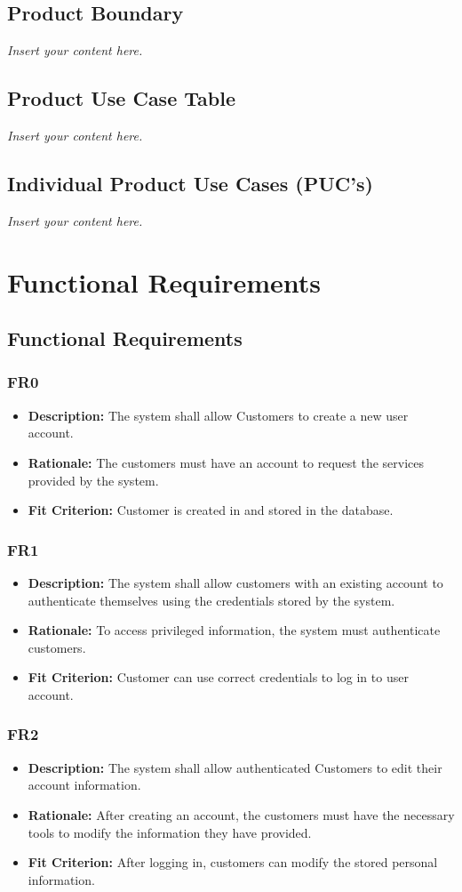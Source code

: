 \documentclass[12pt]{article}
\newcommand{\lips}{\textit{Insert your content here.}}
\begin{document}
\subsection{Product Boundary}
\lips
\subsection{Product Use Case Table}
\lips
\subsection{Individual Product Use Cases (PUC's)}
\lips

\section{Functional Requirements}
\subsection{Functional Requirements}
\subsubsection*{FR0}
\begin{itemize}
  \item \textbf{Description:} The system shall allow Customers to create a new user account.
  \item \textbf{Rationale:} The customers must have an account to request the services provided by the system.
  \item \textbf{Fit Criterion:} Customer is created in and stored in the database.
\end{itemize}
\subsubsection*{FR1}
\begin{itemize}
  \item \textbf{Description:} The system shall allow customers with an existing account to authenticate themselves using the credentials stored by the system.
  \item \textbf{Rationale:} To access privileged information, the system must authenticate customers.
  \item \textbf{Fit Criterion:} Customer can use correct credentials to log in to user account.
\end{itemize}
\subsubsection*{FR2}
\begin{itemize}
  \item \textbf{Description:} The system shall allow authenticated Customers to edit their account information.
  \item \textbf{Rationale:} After creating an account, the customers must have the necessary tools to modify the information they have provided.
  \item \textbf{Fit Criterion:} After logging in, customers can modify the stored personal information.
\end{itemize}
\end{document}
